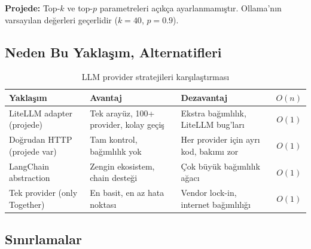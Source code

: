 \textbf{Projede:} Top-$k$ ve top-$p$ parametreleri a\c{c}{\i}k\c{c}a ayarlanmam{\i}\c{s}t{\i}r. Ollama'n{\i}n varsay{\i}lan de\u{g}erleri ge\c{c}erlidir ($k{=}40$, $p{=}0.9$).


\subsection{Neden Bu Yakla\c{s}{\i}m, Alternatifleri}
\label{sec:provider-alternatives}

\begin{table}[H]
\centering
\caption{LLM provider stratejileri kar\c{s}{\i}la\c{s}t{\i}rmas{\i}}
\label{tab:provider-alternatives}
\begin{tabularx}{\textwidth}{lXXc}
\toprule
\color{chapterBlue}\textbf{Yakla\c{s}{\i}m} &
\color{chapterBlue}\textbf{Avantaj} &
\color{chapterBlue}\textbf{Dezavantaj} &
\color{chapterBlue}\textbf{$O(n)$} \\
\midrule
LiteLLM adapter (projede) & Tek aray\"{u}z, 100+ provider, kolay ge\c{c}i\c{s} & Ekstra ba\u{g}{\i}ml{\i}l{\i}k, LiteLLM bug'lar{\i} & $O(1)$ \\
Do\u{g}rudan HTTP (projede var) & Tam kontrol, ba\u{g}{\i}ml{\i}l{\i}k yok & Her provider i\c{c}in ayr{\i} kod, bak{\i}m{\i} zor & $O(1)$ \\
LangChain abstraction & Zengin ekosistem, chain deste\u{g}i & \c{C}ok b\"{u}y\"{u}k ba\u{g}{\i}ml{\i}l{\i}k a\u{g}ac{\i} & $O(1)$ \\
Tek provider (only Together) & En basit, en az hata noktas{\i} & Vendor lock-in, internet ba\u{g}{\i}ml{\i}l{\i}\u{g}{\i} & $O(1)$ \\
\bottomrule
\end{tabularx}
\end{table}

\subsection{S{\i}n{\i}rlamalar}
\label{sec:litellm-limitations}


